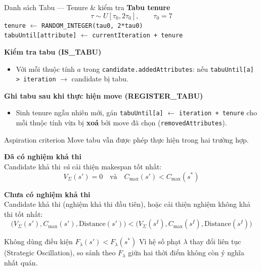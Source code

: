 \documentclass[aspectratio=169]{beamer}
\newcommand{\hl}[1]{\textcolor{blue!60!black}{\textbf{#1}}}
\begin{document}
\begin{frame}{Danh sách Tabu — Tenure \& kiểm tra}
  \textbf{Tabu tenure}
  $$\tau \sim U[\tau_0, 2\tau_0], \qquad \tau_0 = 7$$
  \small \texttt{tenure} $\leftarrow$ \texttt{RANDOM\_INTEGER(tau0, 2*tau0)}\\
  \small \texttt{tabuUntil[attribute]} $\leftarrow$ \texttt{currentIteration + tenure}

  \vspace{3mm}
  \textbf{Kiểm tra tabu (IS\_TABU)}
  \begin{itemize}
    \item \small Với mỗi thuộc tính $a$ trong \texttt{candidate.addedAttributes}: nếu \texttt{tabuUntil[a] > iteration} $\to$ candidate bị tabu.
  \end{itemize}

  \vspace{3mm}
  \textbf{Ghi tabu sau khi thực hiện move (REGISTER\_TABU)}
  \begin{itemize}
    \item \small Sinh tenure ngẫu nhiên mới, gán \texttt{tabuUntil[a]} $\leftarrow$ \texttt{iteration + tenure} cho mỗi thuộc tính vừa bị \hl{xoá} bởi move đã chọn (\texttt{removedAttributes}).
  \end{itemize}
\end{frame}

\begin{frame}{Aspiration criterion}
  \small Move tabu vẫn được phép thực hiện trong hai trường hợp.

  \vspace{2mm}
  \textbf{Đã có nghiệm khả thi}\\
  \small Candidate khả thi \emph{và} cải thiện makespan tốt nhất:
  $$V_\Sigma(s') = 0 \quad \text{và} \quad C_{\max}(s') < C_{\max}(s^*)$$

  \vspace{1mm}
  \textbf{Chưa có nghiệm khả thi}\\
  \small Candidate khả thi (nghiệm khả thi đầu tiên), hoặc cải thiện nghiệm không khả thi tốt nhất:
  $$\big(V_\Sigma(s'), C_{\max}(s'), \text{Distance}(s')\big) < \big(V_\Sigma(s^I), C_{\max}(s^I), \text{Distance}(s^I)\big)$$

  \vspace{1mm}
  \begin{alertblock}{Không dùng điều kiện $F_\lambda(s') < F_\lambda(s^*)$}
    \small Vì hệ số phạt $\lambda$ thay đổi liên tục (Strategic Oscillation), so sánh theo $F_\lambda$ giữa hai thời điểm không còn ý nghĩa nhất quán.
  \end{alertblock}
\end{frame}
\end{document}

